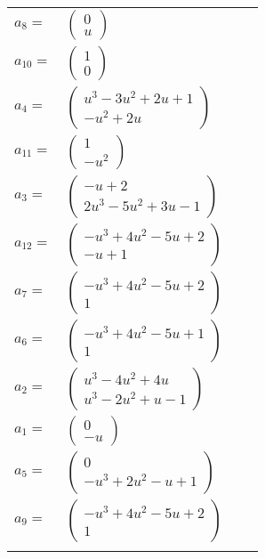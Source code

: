 \documentclass[1p]{elsarticle_modified}
\theoremstyle{definition}
\begin{document}
\begin{tabular}{m{7pt} m{180pt} m{7pt} m{180pt} }
\flushright $a_{8}=$&$\begin{pmatrix}0\\u\end{pmatrix}$ \\
\flushright $a_{10}=$&$\begin{pmatrix}1\\0\end{pmatrix}$ \\
\flushright $a_{4}=$&$\begin{pmatrix}u^3-3 u^2+2 u+1\\- u^2+2 u\end{pmatrix}$ \\
\flushright $a_{11}=$&$\begin{pmatrix}1\\- u^2\end{pmatrix}$ \\
\flushright $a_{3}=$&$\begin{pmatrix}- u+2\\2 u^3-5 u^2+3 u-1\end{pmatrix}$ \\
\flushright $a_{12}=$&$\begin{pmatrix}- u^3+4 u^2-5 u+2\\- u+1\end{pmatrix}$ \\
\flushright $a_{7}=$&$\begin{pmatrix}- u^3+4 u^2-5 u+2\\1\end{pmatrix}$ \\
\flushright $a_{6}=$&$\begin{pmatrix}- u^3+4 u^2-5 u+1\\1\end{pmatrix}$ \\
\flushright $a_{2}=$&$\begin{pmatrix}u^3-4 u^2+4 u\\u^3-2 u^2+u-1\end{pmatrix}$ \\
\flushright $a_{1}=$&$\begin{pmatrix}0\\- u\end{pmatrix}$ \\
\flushright $a_{5}=$&$\begin{pmatrix}0\\- u^3+2 u^2- u+1\end{pmatrix}$ \\
\flushright $a_{9}=$&$\begin{pmatrix}- u^3+4 u^2-5 u+2\\1\end{pmatrix}$\\&\end{tabular}
\end{document}

